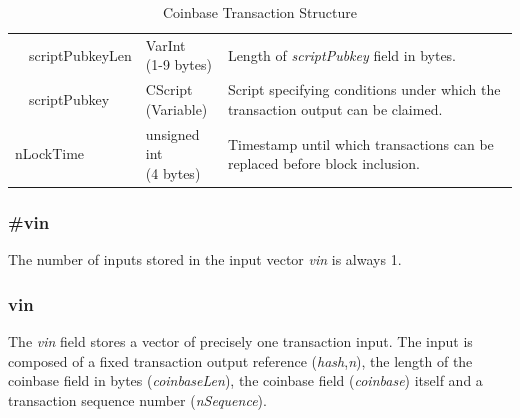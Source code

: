 \begin{table}[ht!]
\begin{tabularx}{\textwidth}{ | m{30pt} | m{70pt} | >{\centering} m{60pt} | X |}
		& scriptPubkeyLen &
		\bigcell{c}{VarInt \\ (1-9 bytes)} &
		Length of \textit{scriptPubkey} field in bytes. \\ \cline{2-4}

		& scriptPubkey &
		\bigcell{c}{CScript \\ (Variable)} &
		Script specifying conditions under which the transaction output can be claimed. \\ \hline
    	
    	\multicolumn{2}{|l|}{nLockTime} &
    	\bigcell{c}{unsigned int \\ (4 bytes)} &
    	Timestamp until which transactions can be replaced before block inclusion.\\ \hline
	
	\end{tabularx}
	\vspace{5pt}
	\caption{Coinbase Transaction Structure}
	\label{tab:TransactionCoinbase}
\end{table}
\vspace{-20pt}

\subsubsection*{\#vin}
The number of inputs stored in the input vector \textit{vin} is always 1.

\subsubsection*{vin}
The \textit{vin} field stores a vector of precisely one transaction input. The input is composed of a fixed transaction output reference (\textit{hash},\textit{n}), the length of the coinbase field in bytes (\textit{coinbaseLen}), the coinbase field (\textit{coinbase}) itself and a transaction sequence number (\textit{nSequence}).

